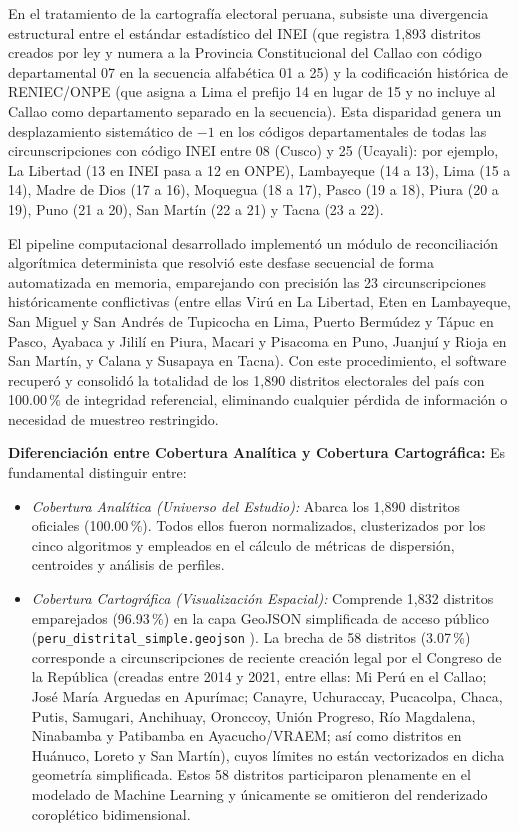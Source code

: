\documentclass[conference,10pt,letterpaper]{IEEEtran}
\begin{document}
En el tratamiento de la cartografía electoral peruana, subsiste una divergencia estructural entre el estándar estadístico del INEI \cite{inei2026_directorio} (que registra 1,893 distritos creados por ley y numera a la Provincia Constitucional del Callao con código departamental 07 en la secuencia alfabética 01 a 25) y la codificación histórica de RENIEC/ONPE (que asigna a Lima el prefijo 14 en lugar de 15 y no incluye al Callao como departamento separado en la secuencia). Esta disparidad genera un desplazamiento sistemático de $-1$ en los códigos departamentales de todas las circunscripciones con código INEI entre 08 (Cusco) y 25 (Ucayali): por ejemplo, La Libertad (13 en INEI pasa a 12 en ONPE), Lambayeque (14 a 13), Lima (15 a 14), Madre de Dios (17 a 16), Moquegua (18 a 17), Pasco (19 a 18), Piura (20 a 19), Puno (21 a 20), San Martín (22 a 21) y Tacna (23 a 22).

El pipeline computacional desarrollado implementó un módulo de reconciliación algorítmica determinista que resolvió este desfase secuencial de forma automatizada en memoria, emparejando con precisión las 23 circunscripciones históricamente conflictivas (entre ellas Virú en La Libertad, Eten en Lambayeque, San Miguel y San Andrés de Tupicocha en Lima, Puerto Bermúdez y Tápuc en Pasco, Ayabaca y Jililí en Piura, Macari y Pisacoma en Puno, Juanjuí y Rioja en San Martín, y Calana y Susapaya en Tacna). Con este procedimiento, el software recuperó y consolidó la totalidad de los 1,890 distritos electorales del país con 100.00\,\% de integridad referencial, eliminando cualquier pérdida de información o necesidad de muestreo restringido.

\textbf{Diferenciación entre Cobertura Analítica y Cobertura Cartográfica:} Es fundamental distinguir entre:
\begin{itemize}
    \item \textit{Cobertura Analítica (Universo del Estudio):} Abarca los 1,890 distritos oficiales (100.00\,\%). Todos ellos fueron normalizados, clusterizados por los cinco algoritmos y empleados en el cálculo de métricas de dispersión, centroides y análisis de perfiles.
    \item \textit{Cobertura Cartográfica (Visualización Espacial):} Comprende 1,832 distritos emparejados (96.93\,\%) en la capa GeoJSON simplificada de acceso público (\texttt{peru\_distrital\_simple.geojson} \cite{eladio2020}). La brecha de 58 distritos (3.07\,\%) corresponde a circunscripciones de reciente creación legal por el Congreso de la República (creadas entre 2014 y 2021, entre ellas: Mi Perú en el Callao; José María Arguedas en Apurímac; Canayre, Uchuraccay, Pucacolpa, Chaca, Putis, Samugari, Anchihuay, Oronccoy, Unión Progreso, Río Magdalena, Ninabamba y Patibamba en Ayacucho/VRAEM; así como distritos en Huánuco, Loreto y San Martín), cuyos límites no están vectorizados en dicha geometría simplificada. Estos 58 distritos participaron plenamente en el modelado de Machine Learning y únicamente se omitieron del renderizado coroplético bidimensional.
\end{itemize}
\end{document}
